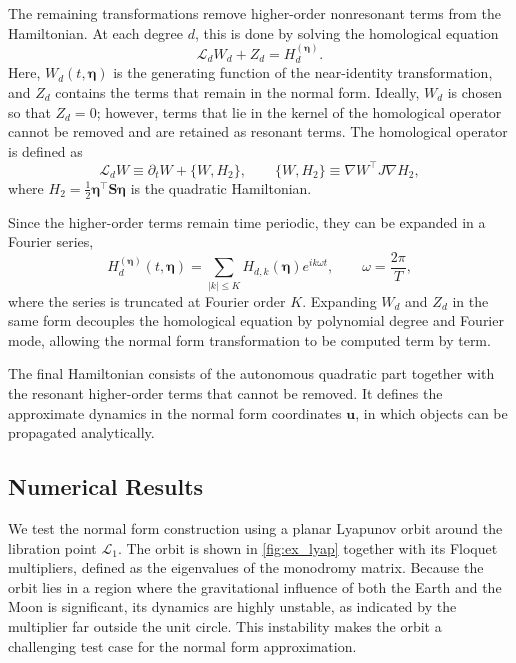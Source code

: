 The remaining transformations remove higher-order nonresonant terms from the Hamiltonian. 
At each degree $d$, this is done by solving the homological equation
\begin{equation}
    \label{eq: homological equation}
    \mathcal{L}_d W_d + Z_d = H_d^{(\boldsymbol{\eta})}.
\end{equation}
Here, $W_d(t,\boldsymbol{\eta})$ is the generating function of the near-identity transformation, and $Z_d$ contains the terms that remain in the normal form. 
Ideally, $W_d$ is chosen so that $Z_d=0$; however, terms that lie in the kernel of the homological operator cannot be removed and are retained as resonant terms. 
The homological operator is defined as
\begin{equation}
    \mathcal{L}_d W 
    \equiv \partial_t W + \{ W, H_2 \}, 
    \qquad 
    \{ W, H_2 \} \equiv \nabla W^{\top} J \nabla H_2,
\end{equation}
where $H_2=\frac{1}{2}\boldsymbol{\eta}^{\top}\boldsymbol{S}\boldsymbol{\eta}$ is the quadratic Hamiltonian.

Since the higher-order terms remain time periodic, they can be expanded in a Fourier series,
\begin{equation}
    H_d^{(\boldsymbol{\eta})}(t,\boldsymbol{\eta})
    =
    \sum_{|k|\le K} H_{d,k}(\boldsymbol{\eta}) e^{ik\omega t},
    \qquad 
    \omega = \frac{2\pi}{T},
\end{equation}
where the series is truncated at Fourier order $K$. 
Expanding $W_d$ and $Z_d$ in the same form decouples the homological equation by polynomial degree and Fourier mode, allowing the normal form transformation to be computed term by term.

The final Hamiltonian consists of the autonomous quadratic part together with the resonant higher-order terms that cannot be removed. 
It defines the approximate dynamics in the normal form coordinates $\boldsymbol{u}$, in which objects can be propagated analytically.

\subsection{Numerical Results}

We test the normal form construction using a planar Lyapunov orbit around the libration point $\mathcal{L}_1$. 
The orbit is shown in \cref{fig:ex_lyap} together with its Floquet multipliers, defined as the eigenvalues of the monodromy matrix. 
Because the orbit lies in a region where the gravitational influence of both the Earth and the Moon is significant, its dynamics are highly unstable, as indicated by the multiplier far outside the unit circle. 
This instability makes the orbit a challenging test case for the normal form approximation.

